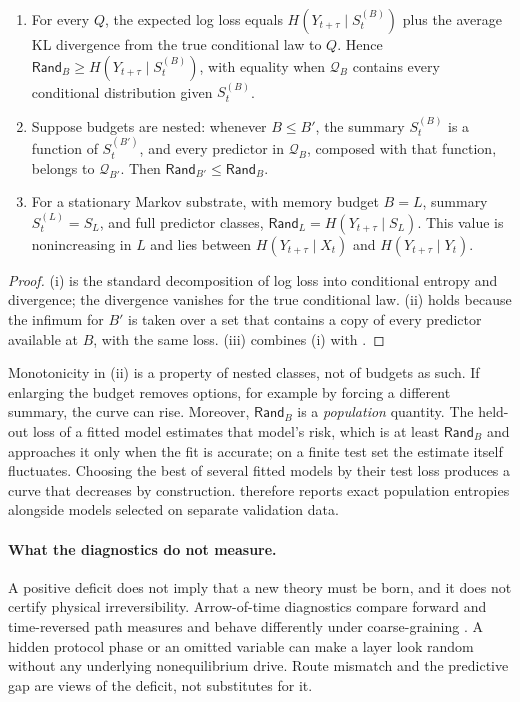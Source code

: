 \begin{proposition}\label{prop:budget}
\begin{enumerate}
\item[(i)] For every $Q$, the expected log loss equals $H(Y_{t+\tau}\mid S^{(B)}_t)$ plus the average KL divergence from the true conditional law to $Q$. Hence $\mathsf{Rand}_B\ge H(Y_{t+\tau}\mid S^{(B)}_t)$, with equality when $\mathcal{Q}_B$ contains every conditional distribution given $S^{(B)}_t$.
\item[(ii)] Suppose budgets are nested: whenever $B\le B'$, the summary $S^{(B)}_t$ is a function of $S^{(B')}_t$, and every predictor in $\mathcal{Q}_B$, composed with that function, belongs to $\mathcal{Q}_{B'}$. Then $\mathsf{Rand}_{B'}\le\mathsf{Rand}_B$.
\item[(iii)] For a stationary Markov substrate, with memory budget $B=L$, summary $S^{(L)}_t=S_L$, and full predictor classes, $\mathsf{Rand}_L=H(Y_{t+\tau}\mid S_L)$. This value is nonincreasing in $L$ and lies between $H(Y_{t+\tau}\mid X_t)$ and $H(Y_{t+\tau}\mid Y_t)$.
\end{enumerate}
\end{proposition}

\begin{proof}
(i) is the standard decomposition of log loss into conditional entropy and divergence; the divergence vanishes for the true conditional law. (ii) holds because the infimum for $B'$ is taken over a set that contains a copy of every predictor available at $B$, with the same loss. (iii) combines (i) with .
\end{proof}

Monotonicity in (ii) is a property of nested classes, not of budgets as such. If enlarging the budget removes options, for example by forcing a different summary, the curve can rise. Moreover, $\mathsf{Rand}_B$ is a \emph{population} quantity. The held-out loss of a fitted model estimates that model's risk, which is at least $\mathsf{Rand}_B$ and approaches it only when the fit is accurate; on a finite test set the estimate itself fluctuates. Choosing the best of several fitted models by their test loss produces a curve that decreases by construction.  therefore reports exact population entropies alongside models selected on separate validation data.

\paragraph{What the diagnostics do not measure.} A positive deficit does not imply that a new theory must be born, and it does not certify physical irreversibility. Arrow-of-time diagnostics compare forward and time-reversed path measures and behave differently under coarse-graining \citep{esposito2012stochasticthermodynamicsundercoarsegraining,tsiokos2026sixbirds}. A hidden protocol phase or an omitted variable can make a layer look random without any underlying nonequilibrium drive. Route mismatch and the predictive gap are views of the deficit, not substitutes for it.
